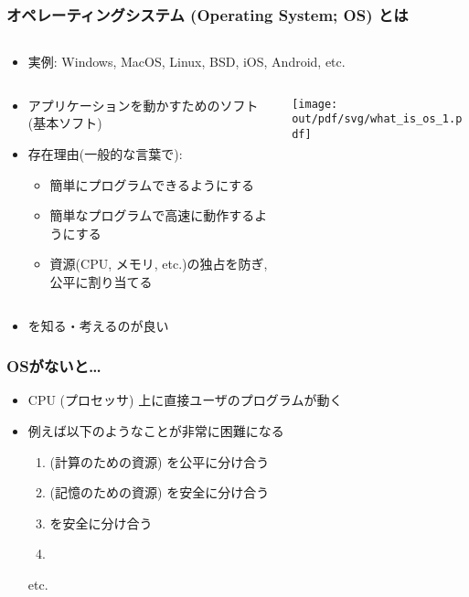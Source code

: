 \documentclass[12pt,dvipdfmx]{beamer}
\begin{document}
\begin{frame}
  \frametitle{オペレーティングシステム (Operating System; OS) とは}
  \begin{columns}
    \begin{column}{1.05\textwidth}
      \begin{itemize}
      \item 実例: Windows, MacOS, Linux, BSD, iOS, Android, etc.
      \end{itemize}
    \end{column}
  \end{columns}
  \begin{columns}
    \begin{column}{0.6\textwidth}
      \begin{itemize}
      \item アプリケーションを動かすためのソフト(基本ソフト)
      \item 存在理由(一般的な言葉で):
        \begin{itemize}
        \item {} 簡単にプログラムできるようにする
        \item {} 簡単なプログラムで高速に動作するようにする
        \item {} 資源(CPU, メモリ, etc.)の独占を防ぎ,
          公平に割り当てる
        \end{itemize}
      \end{itemize}
    \end{column}
    \begin{column}{0.4\textwidth}
      \texttt{[image: out/pdf/svg/what\_is\_os\_1.pdf]}
    \end{column}
  \end{columns}
  \begin{itemize}
  \item {}を知る・考えるのが良い
  \end{itemize}
  
\end{frame}

\begin{frame}
  \frametitle{OSがないと\ldots}
  \begin{itemize}
  \item CPU (プロセッサ) 上に直接ユーザのプログラムが動く
  \item 例えば以下のようなことが非常に困難になる
    \begin{enumerate}
    \item {} (計算のための資源) を公平に分け合う
    \item {} (記憶のための資源) を安全に分け合う
    \item {}を安全に分け合う
    \item {}
    \end{enumerate}
    etc.
  \end{itemize}
\end{frame}
\end{document}

